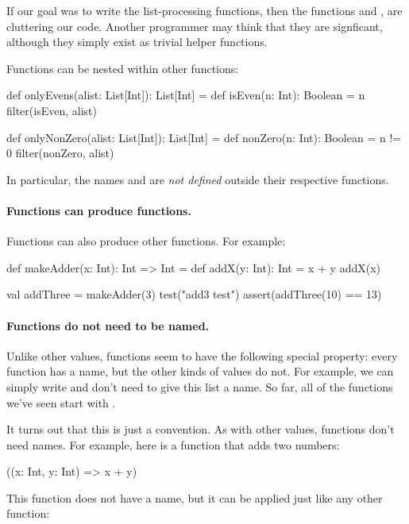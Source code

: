 \documentclass[9pt]{extbook}
\begin{document}
If our goal was to write the list-processing functions, then the
functions  and , are
cluttering our code. Another programmer may think that they are signficant,
although they simply exist as trivial helper functions.

Functions can be nested within other functions:
%
\begin{scalacode}
def onlyEvens(alist: List[Int]): List[Int] = {
  def isEven(n: Int): Boolean = n %
  filter(isEven, alist)
}

def onlyNonZero(alist: List[Int]): List[Int] = {
  def nonZero(n: Int): Boolean = n != 0
  filter(nonZero, alist)
}
\end{scalacode}
%
In particular, the names  and 
are \emph{not defined} outside their respective functions.

\paragraph{Functions can produce functions.}

Functions can also produce other functions. For example:
%
\begin{scalacode}
def makeAdder(x: Int): Int => Int = {
  def addX(y: Int): Int = x + y
  addX(x)
}

val addThree = makeAdder(3)
test("add3 test") {
  assert(addThree(10) == 13)
}
\end{scalacode}

\paragraph{Functions do not need to be named.}

Unlike other values, functions seem to have the following special property:
every function has a name, but the other kinds of values do not.
For example, we can simply write 
and don't need to give this list a name. So far, all of the functions we've seen
start with .

It turns out that this is just a convention. As with other values,
functions don't need names. For example, here is a function that adds two
numbers:

\begin{scalacode}
((x: Int, y: Int) => x + y)
\end{scalacode}

This function does not have a name, but it can be applied just like
any other function:
\end{document}
